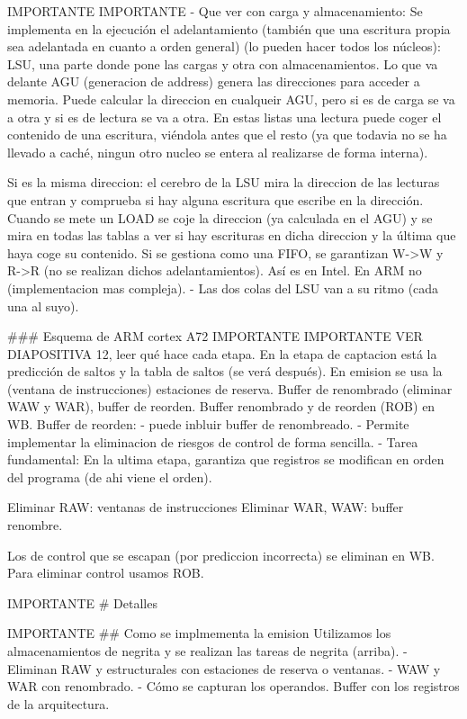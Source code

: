 IMPORTANTE 
IMPORTANTE 
- Que ver con carga y almacenamiento: Se implementa en la ejecución el adelantamiento (también que una escritura propia sea adelantada en cuanto a orden general) (lo pueden hacer todos los núcleos): LSU, una parte donde pone las cargas y otra con almacenamientos. Lo que va delante AGU (generacion de address) genera las direcciones para acceder a memoria. Puede calcular la direccion en cualqueir AGU, pero si es de carga se va a otra y si es de lectura se va a otra. En estas listas una lectura puede coger el contenido de una escritura, viéndola antes que el resto (ya que todavia no se ha llevado a caché, ningun otro nucleo se entera al realizarse de forma interna).

Si es la misma direccion: el cerebro de la LSU mira la direccion de las lecturas que entran y comprueba si hay alguna escritura que escribe en la dirección. Cuando se mete un LOAD se coje la direccion (ya calculada en el AGU) y se mira en todas las tablas a ver si hay escrituras en dicha direccion y la última que haya coge su contenido.
Si se gestiona como una FIFO, se garantizan W->W y R->R (no se realizan dichos adelantamientos). Así es en Intel. En ARM no (implementacion mas compleja).
- Las dos colas del LSU van a su ritmo (cada una al suyo). 

### Esquema de ARM cortex A72
IMPORTANTE
IMPORTANTE
VER DIAPOSITIVA 12, leer qué hace cada etapa.
En la etapa de captacion está la predicción de saltos y la tabla de saltos (se verá después).
En emision se usa la (ventana de instrucciones) estaciones de reserva. Buffer de renombrado (eliminar WAW y WAR), buffer de reorden.
Buffer renombrado y de reorden (ROB) en WB.
Buffer de reorden: 
- puede inbluir buffer de renombreado.
- Permite implementar la eliminacion de riesgos de control de forma sencilla.
- Tarea fundamental: En la ultima etapa, garantiza que registros se modifican en orden del programa (de ahi viene el orden).

Eliminar RAW: ventanas de instrucciones 
Eliminar WAR, WAW: buffer renombre.

Los de control que se escapan (por prediccion incorrecta) se eliminan en WB.
Para eliminar control usamos ROB.



IMPORTANTE
# Detalles

IMPORTANTE
## Como se implmementa la emision
Utilizamos los almacenamientos de negrita y se realizan las tareas de negrita (arriba).
- Eliminan RAW y estructurales con estaciones de reserva o ventanas.
- WAW y WAR con renombrado.
- Cómo se capturan los operandos. Buffer con los registros de la arquitectura.

